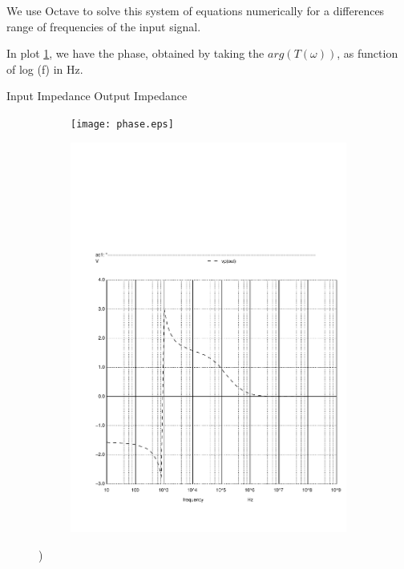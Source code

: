 We use Octave to solve this system of equations numerically for a differences range of frequencies of the input signal.

In plot \ref{fig:output1}, we have the phase, obtained by taking the $arg(T(\omega))$, as function of log (f) in Hz.

Input Impedance Output Impedance

\begin{figure}[h]
  \centering
  \begin{subfigure}{0.5\textwidth}
    \texttt{[image: phase.eps]}
    \label{fig:output1}
  \end{subfigure}
  \begin{subfigure}{0.4\textwidth}
    \includegraphics[width=\linewidth, clip]{phase.pdf}
    \label{fig:output2}
  \end{subfigure}
  \caption{\small  )}
  \label{output_deviation}
\end{figure}


